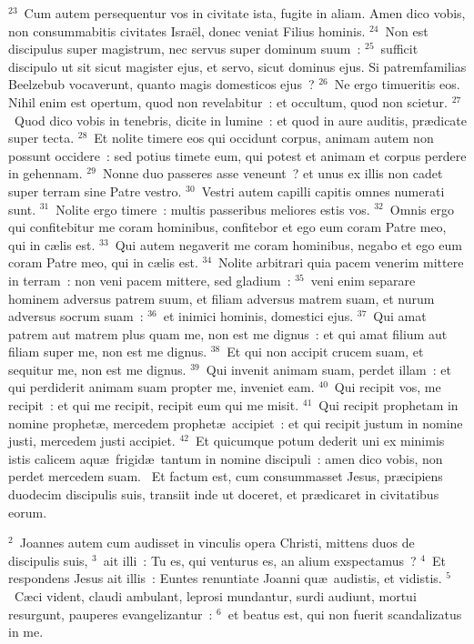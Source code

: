 ${}^{23}$~Cum autem persequentur vos in civitate ista, fugite in aliam. Amen dico vobis, non consummabitis civitates Isra\"el, donec veniat Filius hominis.
${}^{24}$~Non est discipulus super magistrum, nec servus super dominum suum~:
${}^{25}$~sufficit discipulo ut sit sicut magister ejus, et servo, sicut dominus ejus. Si patremfamilias Beelzebub vocaverunt, quanto magis domesticos ejus~?
${}^{26}$~Ne ergo timueritis eos. Nihil enim est opertum, quod non revelabitur~: et occultum, quod non scietur.
${}^{27}$~Quod dico vobis in tenebris, dicite in lumine~: et quod in aure auditis, pr\ae dicate super tecta.
${}^{28}$~Et nolite timere eos qui occidunt corpus, animam autem non possunt occidere~: sed potius timete eum, qui potest et animam et corpus perdere in gehennam.
${}^{29}$~Nonne duo passeres asse veneunt~? et unus ex illis non cadet super terram sine Patre vestro.
${}^{30}$~Vestri autem capilli capitis omnes numerati sunt.
${}^{31}$~Nolite ergo timere~: multis passeribus meliores estis vos.
${}^{32}$~Omnis ergo qui confitebitur me coram hominibus, confitebor et ego eum coram Patre meo, qui in c\ae lis est.
${}^{33}$~Qui autem negaverit me coram hominibus, negabo et ego eum coram Patre meo, qui in c\ae lis est.
${}^{34}$~Nolite arbitrari quia pacem venerim mittere in terram~: non veni pacem mittere, sed gladium~:
${}^{35}$~veni enim separare hominem adversus patrem suum, et filiam adversus matrem suam, et nurum adversus socrum suam~:
${}^{36}$~et inimici hominis, domestici ejus.
${}^{37}$~Qui amat patrem aut matrem plus quam me, non est me dignus~: et qui amat filium aut filiam super me, non est me dignus.
${}^{38}$~Et qui non accipit crucem suam, et sequitur me, non est me dignus.
${}^{39}$~Qui invenit animam suam, perdet illam~: et qui perdiderit animam suam propter me, inveniet eam.
${}^{40}$~Qui recipit vos, me recipit~: et qui me recipit, recipit eum qui me misit.
${}^{41}$~Qui recipit prophetam in nomine prophet\ae , mercedem prophet\ae\ accipiet~: et qui recipit justum in nomine justi, mercedem justi accipiet.
${}^{42}$~Et quicumque potum dederit uni ex minimis istis calicem aqu\ae\ frigid\ae\ tantum in nomine discipuli~: amen dico vobis, non perdet mercedem suam.
~Et factum est, cum consummasset Jesus, pr\ae cipiens duodecim discipulis suis, transiit inde ut doceret, et pr\ae dicaret in civitatibus eorum.


${}^{2}$~Joannes autem cum audisset in vinculis opera Christi, mittens duos de discipulis suis,
${}^{3}$~ait illi~: Tu es, qui venturus es, an alium exspectamus~?
${}^{4}$~Et respondens Jesus ait illis~: Euntes renuntiate Joanni qu\ae\ audistis, et vidistis.
${}^{5}$~C\ae ci vident, claudi ambulant, leprosi mundantur, surdi audiunt, mortui resurgunt, pauperes evangelizantur~:
${}^{6}$~et beatus est, qui non fuerit scandalizatus in me.


